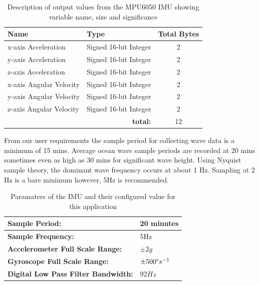 \begin{table}[H]
	\centering
	\caption{Description of output values from the MPU6050 IMU showing variable name, size and significance}
	\begin{tabular}{|l|l|c|}
		\hline
		\textbf{Name} & \textbf{Type} &\textbf{Total Bytes} \\
		\hline
		x-axis Acceleration & Signed 16-bit Integer & 2\\
		\hline
		y-axis Acceleration & Signed 16-bit Integer & 2\\
		\hline
		z-axis Acceleration & Signed 16-bit Integer & 2\\
		\hline
		x-axis Angular Velocity & Signed 16-bit Integer & 2\\
		\hline
		y-axis Angular Velocity & Signed 16-bit Integer & 2\\
		\hline
		z-axis Angular Velocity & Signed 16-bit Integer & 2\\
		\hline
		\multicolumn{2}{r}{\textbf{total:}} &\multicolumn{1}{c}{12}\\
		\cline{3-3}
		\cline{3-3}
	\end{tabular}
	
	\label{tab:IMU_data_outl}
\end{table}

From our user requirements the sample period for collecting wave data is a minimum of 15 mins. Average ocean wave sample periods are recorded at 20 mins sometimes even as high as 30 mins for significant wave height. Using Nyquist sample theory, the dominant wave frequency occurs at about 1 Hz. Sampling at 2 Hz \cite{kohout2015device} is a bare minimum however, 5Hz is recommended. 

\begin{table}[H]
	\centering
	\begin{tabular}{|l|l|}
		\hline
		\textbf{Sample Period: }   &  20 minutes\\
		\hline
		\textbf{Sample Frequency:} & 5Hz \\
		\hline
		\textbf{Accelerometer Full Scale Range:} & $\pm 2g$\\ 
		\hline
		\textbf{Gyroscope Full Scale Range:} & $\pm 500\degree s^{-1}$\\
		\hline
		\textbf{Digital Low Pass Filter Bandwidth:} & $92Hz$\\ 
		\hline
	\end{tabular}
	\caption{Paramaters of the IMU and their configured value for this application}
	\label{tab:IMU_param}
\end{table}

